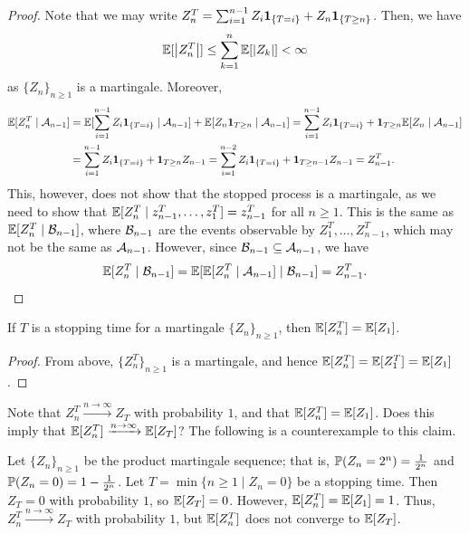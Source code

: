 \begin{proof}
    Note that we may write $Z_{n}^{T} = \sum_{i=1}^{n-1} Z_{i} \textbf{1}_{\{T=i\}} + Z_{n} \textbf{1}_{\{T \geq n\}}$. Then, we have
    \begin{align}
        \mathbb{E}[\left| Z_{n}^{T} \right|] \leq \sum_{k=1}^{n} \mathbb{E}[\left| Z_{k} \right|] < \infty
    \end{align}
    as $\{Z_{n}\}_{n \geq 1}$ is a martingale. Moreover,
    \begin{align}
        \mathbb{E}[Z_{n}^{T} \mid \mathcal{A}_{n-1}] &= \mathbb{E}[\sum_{i=1}^{n-1} Z_{i} \textbf{1}_{\{T=i\}} \mid \mathcal{A}_{n-1}] + \mathbb{E}[Z_{n} \textbf{1}_{T \geq n} \mid \mathcal{A}_{n-1}] = \sum_{i=1}^{n-1} Z_{i} \textbf{1}_{\{T=i\}} + \textbf{1}_{T \geq n} \mathbb{E}[Z_{n} \mid \mathcal{A}_{n-1}] \notag \\
        &= \sum_{i=1}^{n-1} Z_{i} \textbf{1}_{\{T=i\}} + \textbf{1}_{T \geq n} Z_{n-1} = \sum_{i=1}^{n-2} Z_{i} \textbf{1}_{\{T=i\}} + \textbf{1}_{T \geq n-1} Z_{n-1} = Z_{n-1}^{T}.
    \end{align}
    This, however, does not show that the stopped process is a martingale, as we need to show that $\mathbb{E}[Z_{n}^{T} \mid z_{n-1}^{T},\ldots,z_{1}^{T}] = z_{n-1}^{T}$ for all $n \geq 1$. This is the same as $\mathbb{E}[Z_{n}^{T} \mid \mathcal{B}_{n-1}]$, where $\mathcal{B}_{n-1}$ are the events observable by $Z_{1}^{T},\ldots,Z_{n-1}^{T}$, which may not be the same as $\mathcal{A}_{n-1}$. However, since $\mathcal{B}_{n-1} \subseteq \mathcal{A}_{n-1}$, we have
    \begin{align}
        \mathbb{E}[Z_{n}^{T} \mid \mathcal{B}_{n-1}] = \mathbb{E}[\mathbb{E}[Z_{n}^{T} \mid \mathcal{A}_{n-1}] \mid \mathcal{B}_{n-1}] = Z_{n-1}^{T}.
    \end{align}
\end{proof}

\begin{corollary}
    If $T$ is a stopping time for a martingale $\{Z_{n}\}_{n \geq 1}$, then $\mathbb{E}[Z_{n}^{T}] = \mathbb{E}[Z_{1}]$.
\end{corollary}
\begin{proof}
    From above, $\{Z_{n}^{T}\}_{n \geq 1}$ is a martingale, and hence $\mathbb{E}[Z_{n}^{T}] = \mathbb{E}[Z_{1}^{T}] = \mathbb{E}[Z_{1}]$.
\end{proof}

Note that $Z_{n}^{T} \xrightarrow{n \to \infty} Z_{T}$ with probability $1$, and that $\mathbb{E}[Z_{n}^{T}] = \mathbb{E}[Z_{1}]$. Does this imply that $\mathbb{E}[Z_{n}^{T}] \xrightarrow{n \to \infty} \mathbb{E}[Z_{T}]$? The following is a counterexample to this claim.

\begin{example}
    Let $\{Z_{n}\}_{n \geq 1}$ be the product martingale sequence; that is, $\mathbb{P}(Z_{n} = 2^{n}) = \frac{1}{2^{n}}$ and $\mathbb{P}(Z_{n}=0) = 1-\frac{1}{2^{n}}$. Let $T = \min\{n \geq 1 \mid Z_{n} = 0\}$ be a stopping time. Then $Z_{T} = 0$ with probability $1$, so $\mathbb{E}[Z_{T}] = 0$. However, $\mathbb{E}[Z_{n}^{T}] = \mathbb{E}[Z_{1}] = 1$. Thus, $Z_{n}^{T} \xrightarrow{n \to \infty} Z_{T}$ with probability $1$, but $\mathbb{E}[Z_{n}^{T}]$ does not converge to $\mathbb{E}[Z_{T}]$.
\end{example}


